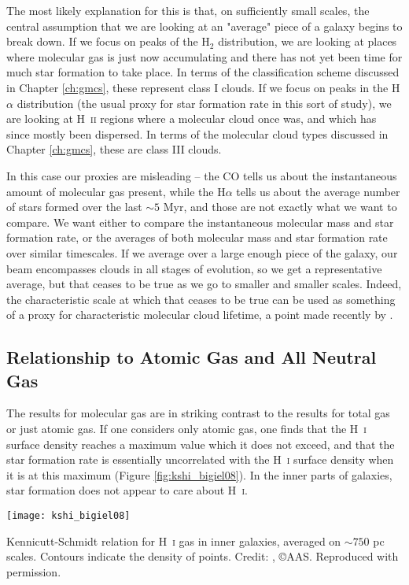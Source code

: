 The most likely explanation for this is that, on sufficiently small scales, the central assumption that we are looking at an "average" piece of a galaxy begins to break down. If we focus on peaks of the H$_2$ distribution, we are looking at places where molecular gas is just now accumulating and there has not yet been time for much star formation to take place. In terms of the classification scheme discussed in Chapter \ref{ch:gmcs}, these represent class I clouds. If we focus on peaks in the H$\alpha$ distribution (the usual proxy for star formation rate in this sort of study), we are looking at H~\textsc{ii} regions where a molecular cloud once was, and which has since mostly been dispersed. In terms of the molecular cloud types discussed in Chapter \ref{ch:gmcs}, these are class III clouds.

In this case our proxies are misleading -- the CO tells us about the instantaneous amount of molecular gas present, while the H$\alpha$ tells us about the average number of stars formed over the last $\sim 5$ Myr, and those are not exactly what we want to compare. We want either to compare the instantaneous molecular mass and star formation rate, or the averages of both molecular mass and star formation rate over similar timescales. If we average over a large enough piece of the galaxy, our beam encompasses clouds in all stages of evolution, so we get a representative average, but that ceases to be true as we go to smaller and smaller scales. Indeed, the characteristic scale at which that ceases to be true can be used as something of a proxy for characteristic molecular cloud lifetime, a point made recently by \citet{kruijssen14c}.


\subsection{Relationship to Atomic Gas and All Neutral Gas}

The results for molecular gas are in striking contrast to the results for total gas or just atomic gas. If one considers only atomic gas, one finds that the H~\textsc{i} surface density reaches a maximum value which it does not exceed, and that the star formation rate is essentially uncorrelated with the H~\textsc{i} surface density when it is at this maximum (Figure \ref{fig:kshi_bigiel08}). In the inner parts of galaxies, star formation does not appear to care about H~\textsc{i}.
\begin{marginfigure}
\texttt{[image: kshi\_bigiel08]}
\caption[Kennicutt-Schmidt relation for H~\textsc{i} gas in inner galaxies]{
\label{fig:kshi_bigiel08}
Kennicutt-Schmidt relation for H~\textsc{i} gas in inner galaxies, averaged on $\sim 750$ pc scales. Contours indicate the density of points. Credit: \citet{bigiel08a}, \copyright AAS. Reproduced with permission.
}
\end{marginfigure}

